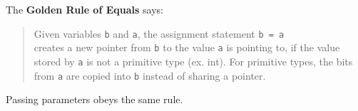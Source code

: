 The \textbf{Golden Rule of Equals} says:

\begin{quote}
Given variables \lstinline$b$ and \lstinline$a$, the assignment statement
\lstinline$b = a$ \\
creates a new pointer from \lstinline$b$ to the value \lstinline$a$ is pointing to, if the value stored by \lstinline$a$ is not a primitive type (ex. int). For primitive types, the bits from \lstinline$a$ are copied into \lstinline$b$ instead of sharing a pointer.
\end{quote}

Passing parameters obeys the same rule.
